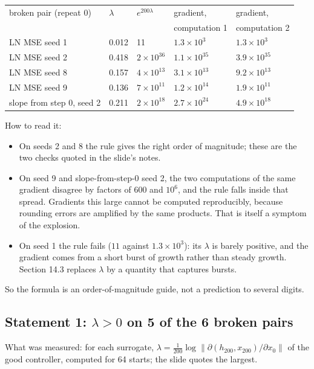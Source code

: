 \documentclass[11pt]{article}
\begin{document}
\begin{center}
\begin{tabular}{lllll}
\toprule
broken pair (repeat 0) & $\lambda$ & $e^{200\lambda}$ & gradient, & gradient, \\
 & & & computation 1 & computation 2 \\
\midrule
LN MSE seed 1 & 0.012 & 11 & $1.3\times10^3$ & $1.3\times10^3$ \\
LN MSE seed 2 & 0.418 & $2\times10^{36}$ & $1.1\times10^{35}$ & $3.9\times10^{35}$ \\
LN MSE seed 8 & 0.157 & $4\times10^{13}$ & $3.1\times10^{13}$ & $9.2\times10^{13}$ \\
LN MSE seed 9 & 0.136 & $7\times10^{11}$ & $1.2\times10^{14}$ & $1.9\times10^{11}$ \\
slope from step 0, seed 2 & 0.211 & $2\times10^{18}$ & $2.7\times10^{24}$ & $4.9\times10^{18}$ \\
\bottomrule
\end{tabular}
\end{center}

How to read it:
\begin{itemize}
\item On seeds 2 and 8 the rule gives the right order of magnitude; these are the two checks quoted in the slide's notes.
\item On seed 9 and slope-from-step-0 seed 2, the two computations of the same gradient disagree by factors of 600 and $10^6$, and the rule falls inside that spread. Gradients this large cannot be computed reproducibly, because rounding errors are amplified by the same products. That is itself a symptom of the explosion.
\item On seed 1 the rule fails ($11$ against $1.3\times10^3$): its $\lambda$ is barely positive, and the gradient comes from a short burst of growth rather than steady growth. Section 14.3 replaces $\lambda$ by a quantity that captures bursts.
\end{itemize}
So the formula is an order-of-magnitude guide, not a prediction to several digits.

\subsection{Statement 1: $\lambda>0$ on 5 of the 6 broken pairs}

What was measured: for each surrogate, $\lambda=\frac1{200}\log\|\partial(h_{200},x_{200})/\partial x_0\|$ of the good controller, computed for 64 starts; the slide quotes the largest.
\end{document}
